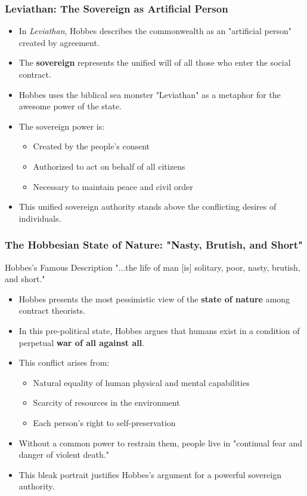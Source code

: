\documentclass[aspectratio=169]{beamer}
\begin{document}
\begin{frame}
  \frametitle{Leviathan: The Sovereign as Artificial Person}
  
  \begin{itemize}
    \item In \textit{Leviathan}, Hobbes describes the commonwealth as an "artificial person" created by agreement.
    \item The \textbf{sovereign} represents the unified will of all those who enter the social contract.
    \item Hobbes uses the biblical sea monster "Leviathan" as a metaphor for the awesome power of the state.
    \item The sovereign power is:
      \begin{itemize}
        \item Created by the people's consent
        \item Authorized to act on behalf of all citizens
        \item Necessary to maintain peace and civil order
      \end{itemize}
    \item This unified sovereign authority stands above the conflicting desires of individuals.
  \end{itemize}
\end{frame}

\begin{frame}
  \frametitle{The Hobbesian State of Nature: "Nasty, Brutish, and Short"}
  
  \begin{alertblock}{Hobbes's Famous Description}
    "...the life of man [is] solitary, poor, nasty, brutish, and short."
  \end{alertblock}
  
  \begin{itemize}
    \item Hobbes presents the most pessimistic view of the \textbf{state of nature} among contract theorists.
    \item In this pre-political state, Hobbes argues that humans exist in a condition of perpetual \textbf{war of all against all}.
    \item This conflict arises from:
      \begin{itemize}
        \item Natural equality of human physical and mental capabilities
        \item Scarcity of resources in the environment
        \item Each person's right to self-preservation
      \end{itemize}
    \item Without a common power to restrain them, people live in "continual fear and danger of violent death."
    \item This bleak portrait justifies Hobbes's argument for a powerful sovereign authority.
  \end{itemize}
\end{frame}
\end{document}
